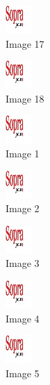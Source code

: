 \begin{figure}[!h]
  \center
  \includegraphics[width=1cm]{img/test.jpg}
  \caption{Image 17}
\end{figure}

\begin{figure}[h]
  \center
  \includegraphics[width=1cm]{img/test.jpg}
  \caption{Image 18}
\end{figure}

\clearpage

\begin{figure}[!h]
  \center
  \includegraphics[width=1cm]{img/test.jpg}
  \caption{Image 1}
\end{figure}

\begin{figure}[!h]
  \center
  \includegraphics[width=1cm]{img/test.jpg}
  \caption{Image 2}
\end{figure}

\begin{figure}[!h]
  \center
  \includegraphics[width=1cm]{img/test.jpg}
  \caption{Image 3}
\end{figure}

\begin{figure}[!h]
  \center
  \includegraphics[width=1cm]{img/test.jpg}
  \caption{Image 4}
\end{figure}

\begin{figure}[!h]
  \center
  \includegraphics[width=1cm]{img/test.jpg}
  \caption{Image 5}
\end{figure}

